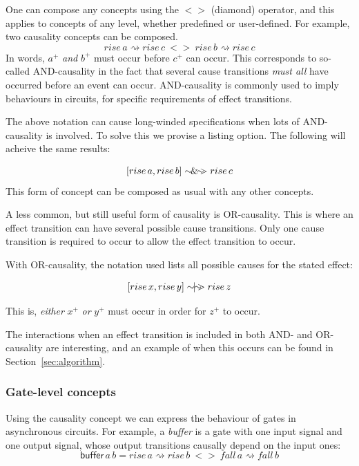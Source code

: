 \documentclass[british,conference,compsoc]{IEEEtran}
\begin{document}
One can compose any concepts using the $<>$ (diamond) operator, and this applies
to concepts of any level, whether predefined or user-defined. For example, 
two causality concepts can be composed.
\[
rise\,a\rightsquigarrow rise\,c\ <> \ rise\,b\rightsquigarrow rise\,c
\]
In words, $a^{+}$ \emph{and} $b^{+}$ must occur before $c^{+}$ can occur. 
This corresponds to so-called AND-causality in the fact that several cause transitions \emph{must all}
have occurred before an event can occur. AND-causality is commonly used
to imply behaviours in circuits, for specific requirements of effect transitions.  

The above notation can cause long-winded specifications when lots of AND-causality is involved. 
To solve this we provise a listing option. The following will acheive the same results:


\[
[rise\,a, rise\,b]\sim\hspace{-1.5mm}\&\hspace{-1.5mm}\sim\hspace{-1.5mm}>rise\,c
\]
This form of concept can be composed as usual with any other concepts.

A less common, but still useful form of causality is OR-causality. This is where an effect transition
can have several possible cause transitions. Only one cause transition is required to occur to allow
the effect transition to occur. 

With OR-causality, the notation used lists all possible causes for the stated effect:


\[
[rise\,x, rise\,y]\sim\hspace{-1.5mm}|\hspace{-1.5mm}\sim\hspace{-1.5mm}>rise\,z
\]

This is, \emph{either} $x^{+}$ \emph{or} $y^{+}$ must occur in order for 
$z^{+}$ to occur.

The interactions when an effect transition is included in both AND- and OR-causality are interesting, and
an example of when this occurs can be found in Section~\ref{sec:algorithm}.

\subsubsection{Gate-level concepts} Using the causality concept we can express
the behaviour of gates in asynchronous circuits. For example, a \emph{buffer}
is a gate with one input signal and one output signal,
whose output transitions causally depend on the input ones:
\[
\mathsf{buffer}\,a\,b=rise\,a\rightsquigarrow rise\,b\ <>\
fall\,a\rightsquigarrow fall\,b
\]
\end{document}
